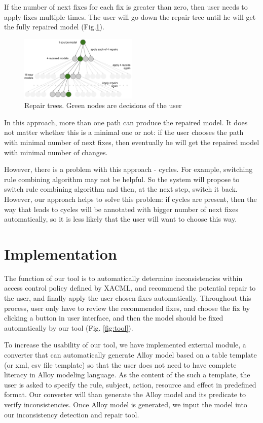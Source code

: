 \documentclass{acm_proc_article-sp}
\begin{document}
If the number of next fixes for each fix is greater than zero, then user needs to apply fixes multiple times. The user will go down the repair tree until he will get the fully repaired model (Fig.\ref{fig:tree}).

\begin{figure}[h]
\includegraphics[width=0.5\textwidth]{tree.png}
\caption{Repair trees. Green nodes are decisions of the user}    
  \label{fig:tree}
\end{figure}

In this approach, more than one path can produce the repaired model. It does not matter whether this is a minimal one or not: if the user chooses the path with minimal number of next fixes, then eventually he will get the repaired model with minimal number of changes.

However, there is a problem with this approach - cycles. For example, switching rule combining algorithm may not be helpful. So the system will propose to switch rule combining algorithm and then, at the next step, switch it back. However, our approach helps to solve this problem: if cycles are present, then the way that leads to cycles will be annotated with bigger number of next fixes automatically, so it is less likely that the user will want to choose this way.

\section{Implementation}
The function of our tool is to automatically determine inconsistencies within access control policy defined by XACML, and recommend the potential repair to the user, and finally apply the user chosen fixes automatically. Throughout this process, user only have to review the recommended fixes, and choose the fix by clicking a button in user interface, and then the model should be fixed automatically by our tool (Fig. \ref{fig:tool}). 

To increase the usability of our tool, we have implemented external module, a converter that can automatically generate Alloy model based on a table template (or xml, csv file template) so that the user does not need to have complete literacy in Alloy modeling language. As the content of the such a template, the user is asked to specify the rule, subject, action, resource and effect in predefined format. Our converter will than generate the Alloy model and its predicate to verify inconsistencies. Once Alloy model is generated, we input the model into our inconsistency detection and repair tool. 
\end{document}

